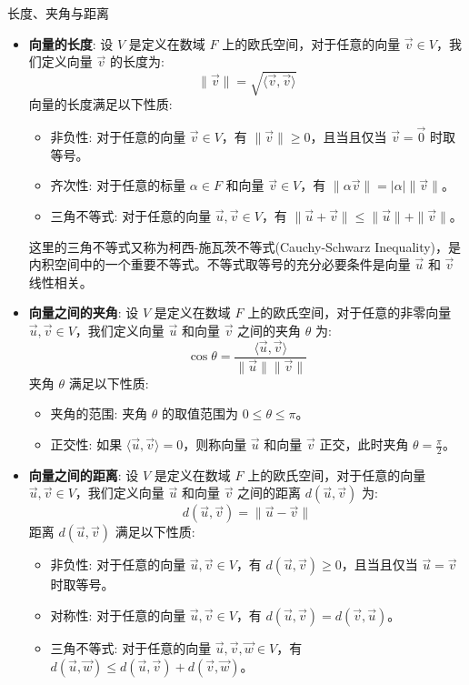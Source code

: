 \documentclass[a4paper,12pt]{ctexart}
\begin{document}
\newpage

    \begin{mydef}{长度、夹角与距离}{}
    \begin{itemize}
    \item \textbf{向量的长度}: 设 $V$ 是定义在数域 $F$ 上的欧氏空间，对于任意的向量 $\vec{v} \in V$，我们定义向量 $\vec{v}$ 的长度为:
    \[
    \|\vec{v}\| = \sqrt{\langle \vec{v}, \vec{v} \rangle}
    \]
    向量的长度满足以下性质:
    \begin{itemize}
        \item 非负性: 对于任意的向量 $\vec{v} \in V$，有 $\|\vec{v}\| \geq 0$，且当且仅当 $\vec{v} = \vec{0}$ 时取等号。
        \item 齐次性: 对于任意的标量 $\alpha \in F$ 和向量 $\vec{v} \in V$，有 $\|\alpha \vec{v}\| = |\alpha| \|\vec{v}\|$。
        \item 三角不等式: 对于任意的向量 $\vec{u}, \vec{v} \in V$，有 $\|\vec{u} + \vec{v}\| \leq \|\vec{u}\| + \|\vec{v}\|$。
    \end{itemize}
    这里的三角不等式又称为柯西-施瓦茨不等式(Cauchy-Schwarz Inequality)，是内积空间中的一个重要不等式。不等式取等号的充分必要条件是向量 $\vec{u}$ 和 $\vec{v}$ 线性相关。
    
    \item \textbf{向量之间的夹角}: 设 $V$ 是定义在数域 $F$ 上的欧氏空间，对于任意的非零向量 $\vec{u}, \vec{v} \in V$，我们定义向量 $\vec{u}$ 和向量 $\vec{v}$ 之间的夹角 $\theta$ 为:
    \[
    \cos \theta = \frac{\langle \vec{u}, \vec{v} \rangle}{\|\vec{u}\| \|\vec{v}\|}
    \]
    夹角 $\theta$ 满足以下性质:
    \begin{itemize}
        \item 夹角的范围: 夹角 $\theta$ 的取值范围为 $0 \leq \theta \leq \pi$。
        \item 正交性: 如果 $\langle \vec{u}, \vec{v} \rangle = 0$，则称向量 $\vec{u}$ 和向量 $\vec{v}$ 正交，此时夹角 $\theta = \frac{\pi}{2}$。
    \end{itemize}
    
    \item \textbf{向量之间的距离}: 设 $V$ 是定义在数域 $F$ 上的欧氏空间，对于任意的向量 $\vec{u}, \vec{v} \in V$，我们定义向量 $\vec{u}$ 和向量 $\vec{v}$ 之间的距离 $d(\vec{u}, \vec{v})$ 为:
    \[
    d(\vec{u}, \vec{v}) = \|\vec{u} - \vec{v}\|
    \]
    距离 $d(\vec{u}, \vec{v})$ 满足以下性质:
    \begin{itemize}
        \item 非负性: 对于任意的向量 $\vec{u}, \vec{v} \in V$，有 $d(\vec{u}, \vec{v}) \geq 0$，且当且仅当 $\vec{u} = \vec{v}$ 时取等号。
        \item 对称性: 对于任意的向量 $\vec{u}, \vec{v} \in V$，有 $d(\vec{u}, \vec{v}) = d(\vec{v}, \vec{u})$。
        \item 三角不等式: 对于任意的向量 $\vec{u}, \vec{v}, \vec{w} \in V$，有 $d(\vec{u}, \vec{w}) \leq d(\vec{u}, \vec{v}) + d(\vec{v}, \vec{w})$。
    \end{itemize}
    \end{itemize}
    \end{mydef}
\end{document}
